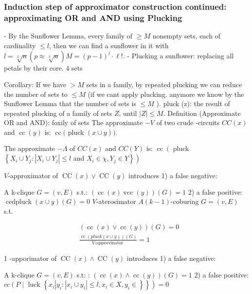 \subsubsection{Induction step of approximator construction continued: approximating OR and AND using Plucking}
- By the Sunflower Lemma, every family of $\geq M$ nonempty sets, each of cardinality $\leqslant l$, then we can find a sunflower in it with $l=\sqrt[3]{n}(p \approx \sqrt[3]{n}) M=(p-1)^l \cdot \ell!$.
- Plucking a sunflower: replacing all petals by their core. 4 sets

Corollary: If we have $>M$ sets in a family, by repeated plucking we can reduce the number of sets to $\leq M$ (if we cant apply plucking. anymore we know by the Sunflower Lemma that the number of sets is $\leqslant M$ ).
pluck (z): the result of repeated plucking of a family of sets $Z$, until $|Z| \leqslant M$.
Definition (Approximate OR and AND): foxily of sets The approximate $-V$ of two crude -circuits $C C(x)$ and $\operatorname{cc}(y)$ is: $\operatorname{cc}($ pluck $(x \cup y))$.

The approximate $-\Lambda$ of $C C(x)$ and $C C(Y)$ is: $\operatorname{cc}\left(\right.$ pluck $\left\{X_i \cup Y_j:\left|X_i \cup Y_j\right| \leqslant l\right.$ and $\left.\left.X_i \in \chi, Y_j \in Y\right\}\right)$





$V$-approximator of $\operatorname{CC}(x) \vee \operatorname{CC}(y)$ introduces
1) a false negative:

A k-clique $G=(v, E)$ s.t.: $(\operatorname{cc}(x) \operatorname{vcc}(y))(G)=1$
2) a false positive:
$\operatorname{cedpluck}(x \cup y)(G)=0$
$V$-aterosimator
$A(k-1)$-coburing $G=(v, E)$ s.t.

$$
\begin{aligned}
& (\operatorname{cc}(x) \vee \operatorname{cc}(y))(G)=0 \\
& \frac{\operatorname{cc}(p l u c k(x \cup y))(G)}{V \text {-approvinator }}=1
\end{aligned}
$$


1 -apporimator of $\operatorname{CC}(x) \wedge \operatorname{CC}(y)$ introduces
1) a false negative:

A k-clique $G=(v, E)$ s.t: : $(\operatorname{cc}(x) \wedge \operatorname{cc}(y))(G)=1$
2) a false positive: $c c\left(P \mid\right.$ luck $\left.\left\{x_i\left|y_i:\left|x_i \cup y_i\right| \leq l, x_i \in X, y_i \in\right\}\right\}\right)=0$

